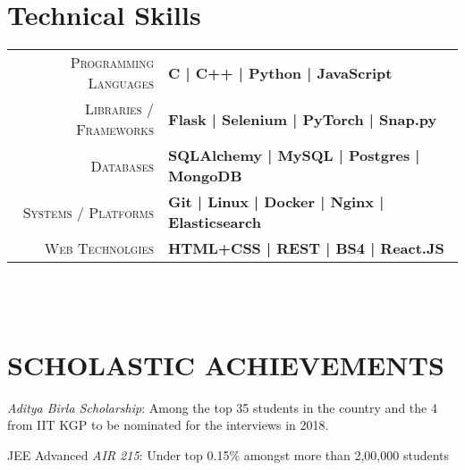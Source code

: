 \documentclass[]{deedy-resume-openfont}
\begin{document}
\begin{minipage}[t]{0.66\textwidth}
\begin{tightemize}
\end{tightemize}
\sectionsep

\\~\\

\section{Technical Skills}
\begin{tabular}{r|p{15cm}}
\textsc{Programming Languages} & \textbf{ C | C++ | Python | JavaScript } \\
\textsc{Libraries / Frameworks} & \textbf{Flask | Selenium | PyTorch | Snap.py }\\
\textsc{Databases} & \textbf{SQLAlchemy | MySQL | Postgres | MongoDB  }\\
\textsc{Systems / Platforms} & \textbf{Git | Linux | Docker | Nginx | Elasticsearch}\\ 
\textsc{Web Technolgies} & \textbf{HTML+CSS | REST | BS4 | React.JS
} \\
\end{tabular}

\\~\\

\section{SCHOLASTIC ACHIEVEMENTS}

\vspace{\topsep} %
\begin{tightemize}

\item {\emph{Aditya Birla Scholarship}:} Among the top 35 students in the country and the 4 from IIT KGP to be nominated for the interviews in 2018.\\
\item{JEE Advanced \emph{AIR 215}:} Under top 0.15\% amongst more than 2,00,000 students \\
\end{tightemize}
\sectionsep

\\~\\


\end{minipage}
\end{document}
